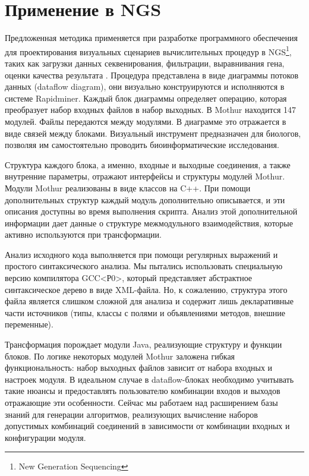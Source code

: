 \documentclass[conference]{IEEEtran} \IEEEoverridecommandlockouts
\begin{document}
\section{Применение в NGS} \label{sec:ngs-appl} 

Предложенная методика применяется при разработке программного обеспечения для проектирования визуальных сценариев вычислительных процедур в NGS\footnote{New Generation Sequencing}, таких как загрузки данных секвенирования, фильтрации, выравнивания гена, оценки качества результата \cite{bit2019}. Процедура представлена в виде диаграммы потоков данных (dataflow diagram), они визуально конструируются и исполняются в системе Rapidminer. Каждый блок диаграммы определяет операцию, которая преобразует набор входных файлов в набор выходных.  В Mothur находится 147 модулей. Файлы передаются между модулями. В диаграмме это отражается в виде связей между блоками. Визуальный инструмент предназначен для биологов, позволяя им самостоятельно проводить биоинформатические исследования. 

Структура каждого блока, а именно, входные и выходные соединения, а также внутренние параметры, отражают интерфейсы и структуры модулей Mothur. Модули Mothur реализованы в виде классов на C++.  При помощи дополнительных структур каждый модуль дополнительно описывается, и эти описания доступны во время выполнения скрипта. Анализ этой дополнительной информации дает данные о структуре межмодульного взаимодействия, которые активно используются при трансформации. 

Анализ исходного кода выполняется при помощи регулярных выражений и простого синтаксического анализа. Мы пытались использовать специальную версию компилятора GCC<Р0>, который представляет абстрактное синтаксическое дерево в виде XML-файла. Но, к сожалению, структура этого файла является слишком сложной для анализа и содержит лишь декларативные части источников (типы, классы с полями и объявлениями методов, внешние переменные). 

Трансформация порождает модули Java, реализующие структуру и функции блоков. По логике некоторых модулей Mothur заложена гибкая функциональность: набор выходных файлов зависит от набора входных и настроек модуля.  В идеальном случае в dataflow-блоках необходимо учитывать такие нюансы и предоставлять пользователю комбинации входов и выходов отражающие эти особенности. Сейчас мы работаем над расширением базы знаний для генерации алгоритмов, реализующих вычисление наборов допустимых комбинаций соединений в зависимости от комбинации входных и конфигурации модуля. 
\end{document}
